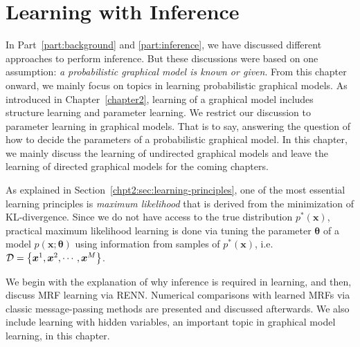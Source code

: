 \chapter{Learning with Inference}
\label{chpt5:undirecteLearning}
In Part~\ref{part:background} and \ref{part:inference}, we have discussed different approaches to perform inference. But these discussions were based on one assumption: \textit{a probabilistic graphical model is known or given}. From this chapter onward, we mainly focus on topics in learning probabilistic graphical models.
As introduced in Chapter~\ref{chapter2}, learning of a graphical model includes structure learning and parameter learning. We restrict our discussion to parameter learning in graphical models. That is to say, answering the question of how to decide the parameters of a probabilistic graphical model.
In this chapter, we mainly discuss the learning of undirected graphical models and leave the learning of directed graphical models for the coming chapters.

As explained in Section~\ref{chpt2:sec:learning-principles}, one of the most essential learning principles is \textit{maximum likelihood} that is derived from the minimization of KL-divergence. Since we do not have access to the true distribution $p^{\ast}(\bm{x})$, practical maximum likelihood learning is done via tuning the parameter $\bm{\theta}$ of a model $p(\bm{x};\bm{\theta})$ using information from samples of $p^{\ast}(\bm{x})$, i.e. $\mathcal{D} = \left\{ \bm{x}^1, \bm{x}^2, \cdots, \bm{x}^{M}\right\}$.

We begin with the explanation of why inference is required in learning, and then, discuss MRF learning via RENN. Numerical comparisons with learned MRFs via classic message-passing methods are presented and discussed afterwards. We also include learning with hidden variables, an important topic in graphical model learning, in this chapter.



